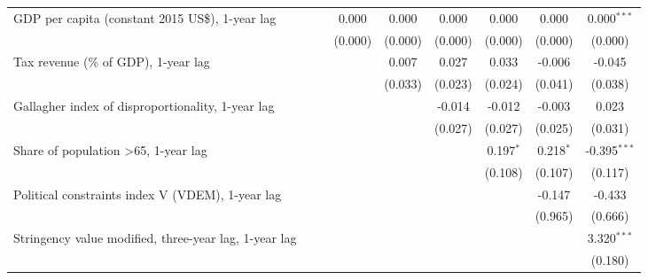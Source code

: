 \begin{table}[htbp]
\begin{tabular}{lcccccccc}
      GDP per capita (constant 2015 US\$), 1-year lag                     &              &              & 0.000        & 0.000       & 0.000        & 0.000        & 0.000       & 0.000$^{***}$\\   
                                                                          &              &              & (0.000)      & (0.000)     & (0.000)      & (0.000)      & (0.000)     & (0.000)\\   
      Tax revenue (\% of GDP), 1-year lag                                 &              &              &              & 0.007       & 0.027        & 0.033        & -0.006      & -0.045\\   
                                                                          &              &              &              & (0.033)     & (0.023)      & (0.024)      & (0.041)     & (0.038)\\   
      Gallagher index of disproportionality, 1-year lag                   &              &              &              &             & -0.014       & -0.012       & -0.003      & 0.023\\   
                                                                          &              &              &              &             & (0.027)      & (0.027)      & (0.025)     & (0.031)\\   
      Share of population >65, 1-year lag                                 &              &              &              &             &              & 0.197$^{*}$  & 0.218$^{*}$ & -0.395$^{***}$\\   
                                                                          &              &              &              &             &              & (0.108)      & (0.107)     & (0.117)\\   
      Political constraints index V (VDEM), 1-year lag                    &              &              &              &             &              &              & -0.147      & -0.433\\   
                                                                          &              &              &              &             &              &              & (0.965)     & (0.666)\\   
      Stringency value modified, three-year lag, 1-year lag               &              &              &              &             &              &              &             & 3.320$^{***}$\\   
                                                                          &              &              &              &             &              &              &             & (0.180)\\   

\end{tabular}
\end{table}
